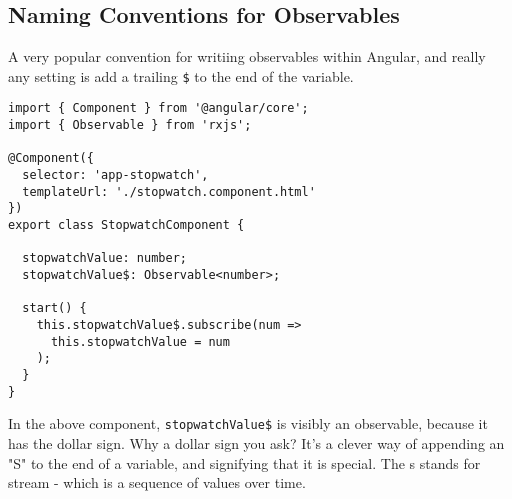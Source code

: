 \subsection{ Naming Conventions for Observables }
A very popular convention for writiing observables within Angular, and really
any setting is add a trailing \lstinline{$} to the end of the variable. 
\begin{lstlisting}
import { Component } from '@angular/core';
import { Observable } from 'rxjs';

@Component({
  selector: 'app-stopwatch',
  templateUrl: './stopwatch.component.html'
})
export class StopwatchComponent {

  stopwatchValue: number;
  stopwatchValue$: Observable<number>;

  start() {
    this.stopwatchValue$.subscribe(num =>
      this.stopwatchValue = num
    );
  }
}  
\end{lstlisting}

In the above component, \lstinline{stopwatchValue$} is visibly an observable,
because it has the dollar sign. Why a dollar sign you ask? It's a clever way 
of appending an "S" to the end of a variable, and signifying that it is 
special. The s stands for stream - which is a sequence of values over time.



